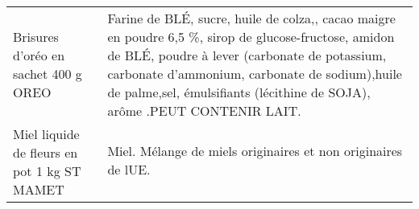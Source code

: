 \begin{longtable}{p{5cm}p{10cm}}
                                                                     Brisures d'oréo en sachet 400 g OREO &                                                                                                                                                                                                                                                                                                                                                                                                                                                                                                                                                                                                                                                                                                                                                       Farine de BLÉ, sucre, huile de colza,, cacao maigre en poudre 6,5 \%, sirop de glucose-fructose, amidon de BLÉ, poudre à lever (carbonate de potassium, carbonate d'ammonium, carbonate de sodium),huile de palme,sel, émulsifiants (lécithine de SOJA), arôme .PEUT CONTENIR LAIT. \\
                                                              Miel liquide de fleurs en pot 1 kg ST MAMET &                                                                                                                                                                                                                                                                                                                                                                                                                                                                                                                                                                                                                                                                                                                                                                                                                                                                                                                                                                          Miel.  Mélange de miels originaires et non originaires de lUE. \\

\end{longtable}
